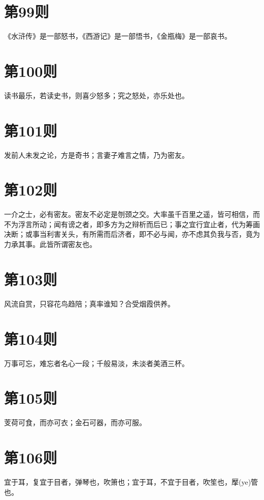 \documentclass[12pt,a4paper]{ctexbook}
\begin{document}
\section{第99则}
《水浒传》是一部怒书，《西游记》是一部悟书，《金瓶梅》是一部哀书。\par

\section{第100则}
读书最乐，若读史书，则喜少怒多；究之怒处，亦乐处也。\par

\section{第101则}
发前人未发之论，方是奇书；言妻子难言之情，乃为密友。\par

\section{第102则}
一介之士，必有密友。密友不必定是刎颈之交。大率虽千百里之遥，皆可相信，而不为浮言所动；闻有谤之者，即多方为之辩析而后已；事之宜行宜止者，代为筹画决断；或事当利害关头，有所需而后济者，即不必与闻，亦不虑其负我与否，竟为力承其事。此皆所谓密友也。\par

\section{第103则}
风流自赏，只容花鸟趋陪；真率谁知？合受烟霞供养。\par

\section{第104则}
万事可忘，难忘者名心一段；千般易淡，未淡者美酒三杯。\par

\section{第105则}
芰荷可食，而亦可衣；金石可器，而亦可服。\par

\section{第106则}
宜于耳，复宜于目者，弹琴也，吹箫也；宜于耳，不宜于目者，吹笙也，擪(ye)管也。\par
\end{document}
